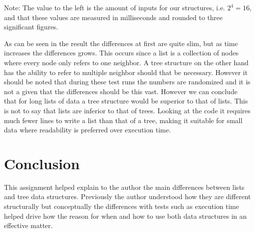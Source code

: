 \documentclass[a4paper,11pt]{article}
\begin{document}
Note: The value to the left is the amount of inputs for our structures, i.e. {$2^4 = 16$}, and that these values are measured in milliseconds and rounded to three significant figures.

As can be seen in the result the differences at first are quite slim, but as time increases the differences grows. This occurs since a list is a collection of nodes where every node only refers to one neighbor. A tree structure on the other hand has the ability to refer to multiple neighbor should that be necessary. However it should be noted that during these test runs the numbers are randomized and it is not a given that the differences should be this vast. However we can conclude that for long lists of data a tree structure would be superior to that of lists.
This is not to say that lists are inferior to that of trees. Looking at the code it requires much fewer lines to write a list than that of a tree, making it suitable for small data where readability is preferred over execution time.  

\section*{Conclusion}

This assignment helped explain to the author the main differences between lists and tree data structures. Previously the author understood how they are different structurally but conceptually the differences with tests such as execution time helped drive how the reason for when and how to use both data structures in an effective matter.
\end{document}
